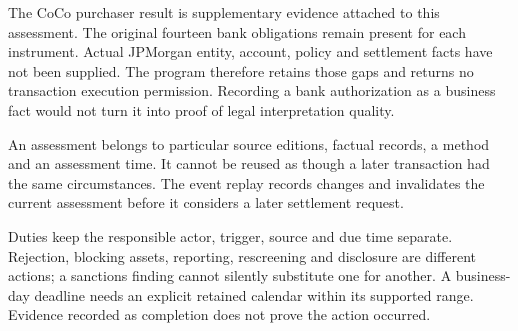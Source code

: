 \documentclass[12pt,a4paper,oneside,openany]{book}
\begin{document}
The CoCo purchaser result is supplementary evidence attached to this assessment.
The original fourteen bank obligations remain present for each instrument.
Actual JPMorgan entity, account, policy and settlement facts have not been
supplied. The program therefore retains those gaps and returns no transaction
execution permission. Recording a bank authorization as a business fact would
not turn it into proof of legal interpretation quality.

\clearpage
{}
An assessment belongs to particular source editions, factual records, a method
and an assessment time. It cannot be reused as though a later transaction had
the same circumstances. The event replay records changes and invalidates the
current assessment before it considers a later settlement request.

\begin{MapDiagram}
\end{MapDiagram}

Duties keep the responsible actor, trigger, source and due time separate.
Rejection, blocking assets, reporting, rescreening and disclosure are different
actions; a sanctions finding cannot silently substitute one for another. A
business-day deadline needs an explicit retained calendar within its supported
range. Evidence recorded as completion does not prove the action occurred.
\end{document}
